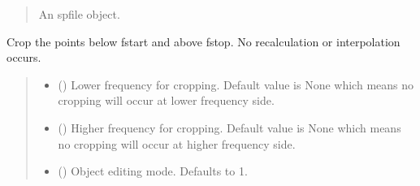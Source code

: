 \documentclass[letterpaper,10pt,english]{sphinxmanual}
\begin{document}
\begin{fulllineitems}
\begin{fulllineitems}
\begin{quote}
\begin{description}
\begin{itemize}
\end{itemize}

\sphinxAtStartPar
An spfile object.

\sphinxAtStartPar
{\hyperref[\detokenize{touchstone:touchstone.spfile}]{}}

\end{description}\end{quote}

\end{fulllineitems}


\begin{fulllineitems}
\label{\detokenize{touchstone:touchstone.spfile.crop_with_frequency}}
\pysigstartsignatures
{}
\pysigstopsignatures
\sphinxAtStartPar
Crop the points below fstart and above fstop. No recalculation or interpolation occurs.
\begin{quote}\begin{description}
\begin{itemize}
\item {}
\sphinxAtStartPar
{} (\sphinxstyleliteralemphasis{\sphinxupquote{, }}) \textendash{} Lower frequency for cropping. Default value is None which means no cropping will occur at lower frequency side.

\item {}
\sphinxAtStartPar
{} (\sphinxstyleliteralemphasis{\sphinxupquote{, }}) \textendash{} Higher frequency for cropping. Default value is None which means no cropping will occur at higher frequency side.

\item {}
\sphinxAtStartPar
{} (\sphinxstyleliteralemphasis{\sphinxupquote{, }}) \textendash{} Object editing mode. Defaults to \sphinxhyphen{}1.


\end{itemize}
\end{description}
\end{quote}
\end{fulllineitems}
\end{fulllineitems}
\end{document}

